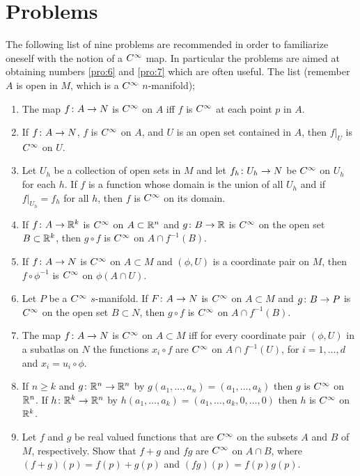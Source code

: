 \documentclass[../main]{subfiles}
\begin{document}
\section*{Problems}\label{ch01:ex1}

The following list of nine problems are recommended in order to familiarize oneself with the notion of a $C^\infty$ map. In particular the problems are aimed at obtaining numbers \ref{pro:6} and \ref{pro:7} which are often useful. The list (remember $A$ is open in $M$, which is a $C^\infty$ $n$-manifold);

\begin{enumerate}
    \item\label{pro:1} The map $f\colon A\to N$ is $C^\infty$ on $A$ iff $f$ is $C^\infty$ at each point $p$ in $A$.
    \item\label{pro:2} If $f\colon A\to N$, $f$ is $C^\infty$ on $A$, and $U$ is an open set contained in $A$, then $f|_U$ is $C^\infty$ on $U$.
    \item\label{pro:3} Let $U_h$ be a collection of open sets in $M$ and let $f_h\colon U_h\to N$ be $C^\infty$ on $U_h$ for each $h$. If $f$ is a function whose domain is the union of all $U_h$ and if $f\vert_{U_h}=f_h$ for all $h$, then $f$ is $C^\infty$ on its domain.
    \item\label{pro:4} If $f\colon A\to\mathbb{R}^k$ is $C^\infty$ on $A\subset\mathbb{R}^n$ and $g\colon B\to\mathbb{R}$ is $C^\infty$ on the open set $B\subset\mathbb{R}^k$, then $g\circ f$ is $C^\infty$ on $A\cap f^{-1}(B)$.
    \item\label{pro:5} If $f\colon A\to N$ is $C^\infty$ on $A\subset M$ and $(\phi, U)$ is a coordinate pair on $M$, then $f\circ\phi^{-1}$ is $C^\infty$ on $\phi(A\cap U)$.
    \item\label{pro:6} Let $P$ be a $C^\infty$ $s$-manifold. If $F\colon A\to N$ is $C^\infty$ on $A\subset M$ and $g\colon B\to P$ is $C^\infty$ on the open set $B\subset N$, then $g\circ f$ is $C^\infty$ on $A\cap f^{-1}(B)$.
    \item\label{pro:7} The map $f\colon A\to N$ is $C^\infty$ on $A\subset M$ iff for every coordinate pair $(\phi,U)$ in a subatlas on $N$ the functions $x_i\circ f$ are $C^\infty$ on $A\cap f^{-1}(U)$, for $i=1,\dots,d$ and $x_i=u_i\circ\phi$.
    \item\label{pro:8} If $n\geq k$ and $g\colon\mathbb{R}^n\to\mathbb{R}^n$ by $g(a_1,\dots,a_n)=(a_1,\dots,a_k)$ then $g$ is $C^\infty$ on $\mathbb{R}^n$. If $h\colon\mathbb{R}^k\to\mathbb{R}^n$ by $h(a_1,\dots,a_k)=(a_1,\dots,a_k,0,\dots,0)$ then $h$ is $C^\infty$ on $\mathbb{R}^k$.
    \item\label{pro:9} Let $f$ and $g$ be real valued functions that are $C^\infty$ on the subsets $A$ and $B$ of $M$, respectively. Show that $f+g$ and $fg$ are $C^\infty$ on $A\cap B$, where $(f+g)(p)=f(p)+g(p)$ and $(fg)(p)=f(p)g(p)$.
\end{enumerate}
\end{document}

